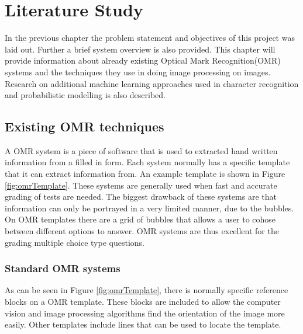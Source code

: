 \chapter{Literature Study}
\label{ch:LiteratureStudy}
    \graphicspath{{Chapter2/Chapter2Figures/}}

In the previous chapter the problem statement and objectives of this project was laid out. Further a brief system overview is also provided.
This chapter will provide information about already existing Optical Mark Recognition(OMR) systems and the techniques they use in doing image processing on images. Research on additional machine learning approaches used in character recognition and probabilistic modelling is also described.

\section{Existing OMR techniques}
A OMR system is a piece of software that is used to extracted hand written information from a filled in form. Each system normally has a specific template that it can extract information from. An example template is shown in Figure \ref{fig:omrTemplate}. These systems are generally used when fast and accurate grading of tests are needed. The biggest drawback of these systems are that information can only be portrayed in a very limited manner, due to the bubbles. On OMR templates there are a grid of bubbles that allows a user to cohose between different options to answer. OMR systems are thus excellent for the grading multiple choice type questions. 

\subsection{Standard OMR systems}
\label{sec:StandardTech}

As can be seen in Figure \ref{fig:omrTemplate}, there is normally specific reference blocks on a OMR template. These blocks are included to allow the computer vision and image processing algorithms find the orientation of the image more easily. Other templates include lines that can be used to locate the template.

